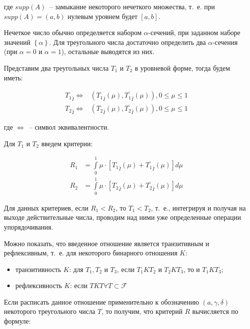 \documentclass[a4paper,14pt,russian]{extreport}
\begin{document}
где $supp\left(A\right)$~-- замыкание некоторого нечеткого множества, т.~е. при $supp\left(A\right)=\left(a, b\right)$ нулевым уровнем будет $\left[a,b\right]$.

Нечеткое число обычно определяется набором $\alpha$-сечений, при заданном наборе значений $\left\{\alpha\right\}$. Для треугольного числа достаточно определить два $\alpha$-сечения (при $\alpha=0$ и $\alpha=1$), остальные выводятся из них.

Представим два треугольных числа $T_1$ и $T_2$ в уровневой форме, тогда будем иметь:

$$
\begin{aligned}
{T_1}_{\stackrel{'}I}\Leftrightarrow & \left({T_1}_{\stackrel{'}I}\left(\mu\right),\overline{{T_1}_{\stackrel{'}I}}\left(\mu\right)\right), 0\leq\mu\leq 1 \\
{T_2}_{\stackrel{'}I}\Leftrightarrow & \left({T_2}_{\stackrel{'}I}\left(\mu\right),\overline{{T_2}_{\stackrel{'}I}}\left(\mu\right)\right), 0\leq\mu\leq 1
\end{aligned}
$$

где $\Leftrightarrow$~-- символ эквивалентности.

Для $T_1$ и $T_2$ введем критерии:

$$
\begin{aligned}
R_1 &= \int\limits_0^1 \mu\cdot\left[{T_1}_{\stackrel{'}I}\left(\mu\right)+\overline{{T_1}_{\stackrel{'}I}}\left(\mu\right)\right] d\mu \\
R_2 &= \int\limits_0^1 \mu\cdot\left[{T_2}_{\stackrel{'}I}\left(\mu\right)+\overline{{T_2}_{\stackrel{'}I}}\left(\mu\right)\right] d\mu
\end{aligned}
$$

Для данных критериев, если $R_1<R_2$, то $T_1<T_2$, т.~е., интегрируя и получая на выходе действительные числа, проводим над ними уже определенные операции упорядочивания.

Можно показать, что введенное отношение является транзитивным и рефлексивным, т.~е. для некоторого бинарного отношения $K$:
\begin{itemize}
\item транзитивность $K$: для $T_1,T_2$ и $T_3$, если $T_1 K T_2$ и $T_2 K T_3$, то и $T_1 K T_3$;
\item рефлексивность $K$: если $T K T \forall T\subset \mathcal{F}$
\end{itemize}

Если расписать данное отношение применительно к обозначению $\left(a,\gamma,\delta\right)$ некоторого треугольного числа $T$, то получим, что критерий $R$ вычисляется по формуле:
\end{document}
